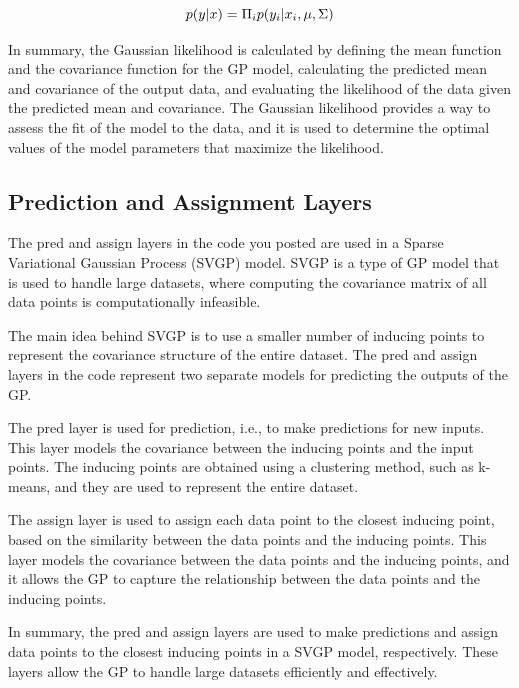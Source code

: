 \documentclass[12pt,a4paper]{report}
\begin{document}
\begin{equation}
    \centering
    p(y|x) = \Pi_i p(y_i|x_i, \mu, \Sigma) 
\end{equation}

In summary, the Gaussian likelihood is calculated by defining the mean function and the covariance function for the GP model, calculating the predicted mean and covariance of the output data, and evaluating the likelihood of the data given the predicted mean and covariance. 
The Gaussian likelihood provides a way to assess the fit of the model to the data, and it is used to determine the optimal values of the model parameters that maximize the likelihood.

\subsection{Prediction and Assignment Layers}

The pred and assign layers in the code you posted are used in a Sparse Variational Gaussian Process (SVGP) model. 
SVGP is a type of GP model that is used to handle large datasets, where computing the covariance matrix of all data points is computationally infeasible.

The main idea behind SVGP is to use a smaller number of inducing points to represent the covariance structure of the entire dataset. 
The pred and assign layers in the code represent two separate models for predicting the outputs of the GP.

The pred layer is used for prediction, i.e., to make predictions for new inputs. 
This layer models the covariance between the inducing points and the input points. 
The inducing points are obtained using a clustering method, such as k-means, and they are used to represent the entire dataset.

The assign layer is used to assign each data point to the closest inducing point, based on the similarity between the data points and the inducing points. 
This layer models the covariance between the data points and the inducing points, and it allows the GP to capture the relationship between the data points and the inducing points.

In summary, the pred and assign layers are used to make predictions and assign data points to the closest inducing points in a SVGP model, respectively. 
These layers allow the GP to handle large datasets efficiently and effectively.

\end{document}
